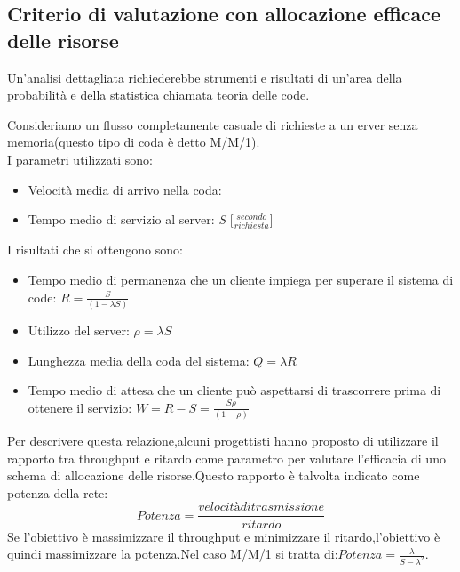 \subsection{Criterio di valutazione con allocazione efficace delle risorse}
Un'analisi dettagliata richiederebbe strumenti e risultati di un'area della probabilità e della statistica chiamata teoria delle code.
\begin{example}
  Consideriamo un flusso completamente casuale di richieste a un erver senza memoria(questo tipo di coda è detto M/M/1).\\
  I parametri utilizzati sono:
  \begin{itemize}
    \item Velocità media di arrivo nella coda: 
    \item Tempo medio di servizio al server: \textit{S} [$\frac{secondo}{richiesta}$]
  \end{itemize}
  I risultati che si ottengono sono:
  \begin{itemize}
    \item Tempo medio di permanenza che un cliente impiega per superare il sistema di code: $R = \frac{S}{(1-\lambda S)}$
    \item Utilizzo del server: $\rho = \lambda S$
    \item Lunghezza media della coda del sistema: $Q = \lambda R$
    \item Tempo medio di attesa che un cliente può aspettarsi di trascorrere prima di ottenere il servizio: $W = R - S = \frac{S\rho}{(1-\rho)}$
  \end{itemize}
\end{example}

Per descrivere questa relazione,alcuni progettisti hanno proposto di utilizzare il rapporto tra throughput e ritardo come parametro per valutare l'efficacia di uno schema di allocazione delle risorse.Questo rapporto è talvolta indicato come potenza della rete:
\begin{equation}
  Potenza = \frac{velocità di trasmissione}{ritardo}
\end{equation}
Se l'obiettivo è massimizzare il throughput e minimizzare il ritardo,l'obiettivo è quindi massimizzare la potenza.Nel caso M/M/1 si tratta di:$Potenza = \frac{\lambda}{S-\lambda ^{2}}$.
